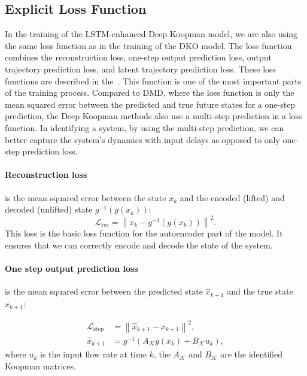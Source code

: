 \documentclass[conference]{IEEEtran}
\begin{document}
\subsection{Explicit Loss Function}
In the training of the LSTM-enhanced Deep Koopman model, we are also using the same loss function as in the training of the DKO model. The loss function combines the reconstruction loss, one-step output prediction loss, output trajectory prediction loss, and latent trajectory prediction loss. These loss functions are described in the~\cite{lusch2018deep}. This function is one of the most important parts of the training process. Compared to DMD, where the loss function is only the mean squared error between the predicted and true future states for a one-step prediction, the Deep Koopman methods also use a multi-step prediction in a loss function. In identifying a system, by using the multi-step prediction, we can better capture the system's dynamics with input delays as opposed to only one-step prediction loss.

\paragraph*{Reconstruction loss}
is the mean squared error between the state \(x_k\) and the encoded (lifted) and decoded (unlifted) state \(g^{-1}(g(x_k))\):
\begin{equation}
    \mathcal{L}_{\text{rec}} = \left\|x_k - g^{-1}(g(x_k))\right\|^2.
\end{equation}
This loss is the basic loss function for the autoencoder part of the model. It ensures that we can correctly encode and decode the state of the system.

\paragraph*{One step output prediction loss}
is the mean squared error between the predicted state \(\hat{x}_{k+1}\) and the true state \(x_{k+1}\):

\begin{subequations}
    \begin{align}
        \mathcal{L}_{\text{step}} & = \left\|\hat{x}_{k+1} - x_{k+1}\right\|^2,       \\
        \hat{x}_{k+1}             & = g^{-1}(A_\mathcal{K}g(x_k) + B_\mathcal{K}u_k),
    \end{align}
\end{subequations}
where \(u_k\) is the input flow rate at time \(k\), the \(A_\mathcal{K}\) and \(B_\mathcal{K}\) are the identified Koopman matrices.
\end{document}
